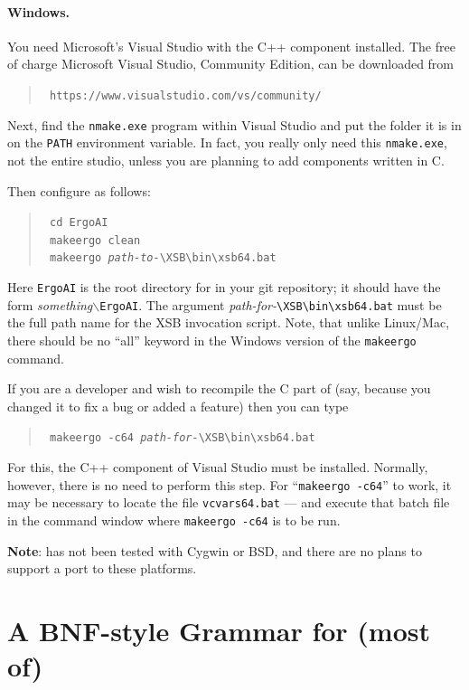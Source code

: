 \documentclass[11pt]{article}
\newcommand{\ERGO}{\mbox{\smaller{\ensuremath{\cal{E}}\smaller{{\sc{RGO}}}}}\xspace}
\newcommand{\FLSYSTEM}{\ERGO}
\newcommand{\bs}{\textbackslash}
\begin{document}
\paragraph{Windows.}
You need Microsoft's Visual Studio with the C++ component installed.
The free of charge Microsoft Visual Studio, Community Edition, can be
downloaded from
\begin{quote}
\tt
 https://www.visualstudio.com/vs/community/
\end{quote}
Next, find the \texttt{nmake.exe} program within Visual Studio and put the
folder it is in on the \texttt{PATH} environment variable.  
In fact, you really only need this \texttt{nmake.exe}, not the entire
studio, unless you are planning to add components written in C.

Then configure \FLSYSTEM as follows:
\begin{quote}
  \tt
   cd ErgoAI\\
   \tt
   makeergo clean\\
   \tt
   makeergo \textnormal{\emph{path-to-}}{\bs}XSB{\bs}bin{\bs}xsb64.bat
\end{quote}
Here \texttt{ErgoAI}  is the root directory 
for \FLSYSTEM in your git repository; it should have the form
\emph{something}$\backslash${\tt ErgoAI}. The argument
\textnormal{\emph{path-for-}}\texttt{{\bs}XSB{\bs}bin{\bs}xsb64.bat}
must be the full path name for the XSB invocation script.
Note, that unlike Linux/Mac, there should be no ``all'' keyword
in the Windows version of the \texttt{makeergo} command.

If you are a developer and wish to recompile the C part of \FLSYSTEM
(say, because you changed it to fix a bug or added a feature)
then you can type
\begin{quote}
\tt
   makeergo -c64 \textnormal{\emph{path-for-}}{\bs}XSB{\bs}bin{\bs}xsb64.bat
\end{quote}
For this, the C++ component of Visual Studio must be installed.
Normally, however, there is no need to perform this step.
For ``\texttt{makeergo -c64}'' to work,  
it may be necessary to locate the file
\texttt{vcvars64.bat} --- and execute that batch file
in the command window where \texttt{makeergo -c64} is to be run.

\textbf{Note}: \FLSYSTEM has not been tested with Cygwin or BSD,
and there are no
plans to support a port to these platforms.


\section{A BNF-style Grammar for (most of) \FLSYSTEM}\label{app-bnf}
\end{document}
